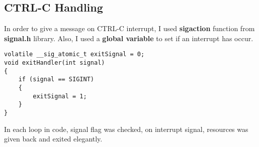 \documentclass{article}
\begin{document}
\subsection{CTRL-C Handling}
In order to give a message on CTRL-C interrupt, I used \textbf{sigaction} function from \textbf{signal.h} library.
Also, I used a \textbf{global variable} to set if an interrupt has occur.
\begin{lstlisting}[style=CStyle]
volatile __sig_atomic_t exitSignal = 0;
void exitHandler(int signal)
{
    if (signal == SIGINT)
    {
        exitSignal = 1;
    }
}
\end{lstlisting}
In each loop in code, signal flag was checked, on interrupt signal, resources was given back and exited elegantly.
\end{document}
